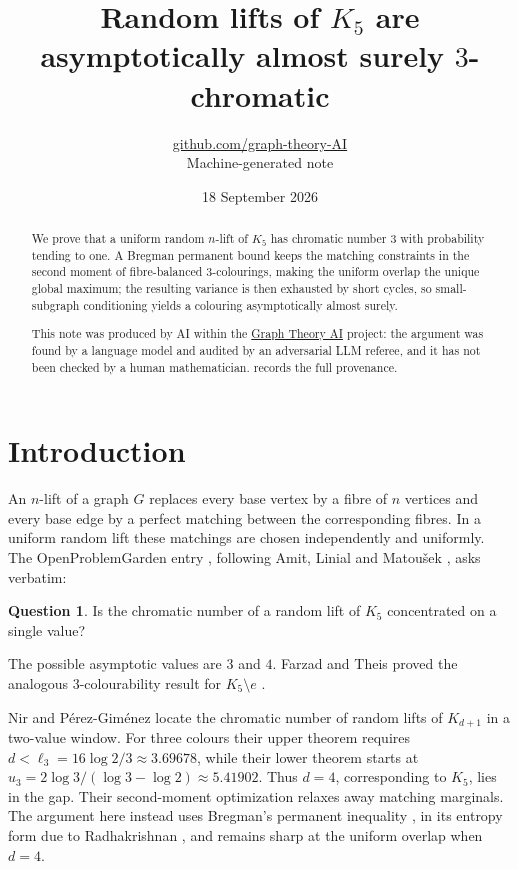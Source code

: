 \documentclass[11pt,a4paper]{article}
\title{Random lifts of $K_5$ are asymptotically almost surely $3$-chromatic}
\author{\href{https://github.com/graph-theory-AI}{github.com/graph-theory-AI}\\[2pt] \normalsize Machine-generated note}
\date{18 September 2026}
\theoremstyle{plain}
\theoremstyle{definition}
\newtheorem{question}[theorem]{Question}
\theoremstyle{remark}
\begin{document}
\maketitle

\begin{abstract}
We prove that a uniform random $n$-lift of $K_5$ has chromatic number $3$ with
probability tending to one.  A Bregman permanent bound keeps the matching constraints
in the second moment of fibre-balanced $3$-colourings, making the uniform overlap the
unique global maximum; the resulting variance is then exhausted by short cycles, so
small-subgraph conditioning yields a colouring asymptotically almost surely.

\medskip\noindent\small This note was produced by AI within
the \href{https://github.com/graph-theory-AI/Graph-Theory-LLM-Proofs}{Graph Theory AI}
project: the argument was found by a language model and audited by an adversarial LLM
referee, and it has not been checked by a human mathematician. 
records the full provenance.
\end{abstract}

\section{Introduction}

An $n$-lift of a graph $G$ replaces every base vertex by a fibre of $n$ vertices and
every base edge by a perfect matching between the corresponding fibres.  In a uniform
random lift these matchings are chosen independently and uniformly.  The
OpenProblemGarden entry \cite{OPG}, following Amit, Linial and Matoušek \cite{ALM02},
asks verbatim:
\begin{question}\label{q:opg}
Is the chromatic number of a random lift of $K_5$ concentrated on a single value?
\end{question}
The possible asymptotic values are $3$ and $4$.  Farzad and Theis proved the analogous
$3$-colourability result for $K_5\setminus e$ \cite{FT12}.

Nir and Pérez-Giménez \cite{NPG21} locate the chromatic number of random lifts of
$K_{d+1}$ in a two-value window.  For three colours their upper theorem requires
$d<\ell_3=16\log2/3\approx3.69678$, while their lower theorem starts at
$u_3=2\log3/(\log3-\log2)\approx5.41902$.  Thus $d=4$, corresponding to $K_5$, lies
in the gap.  Their second-moment optimization relaxes away matching marginals.  The
argument here instead uses Bregman's permanent inequality \cite{Bregman73}, in its
entropy form due to Radhakrishnan \cite{Radhakrishnan97}, and remains sharp at the
uniform overlap when $d=4$.
\end{document}
